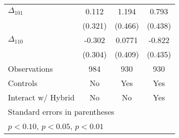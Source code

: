{\begin{tabular}{l*{3}{c}}
$\Delta_{101}$&    0.112         &    1.194\sym{**} &    0.793\sym{*}  \\
          &  (0.321)         &  (0.466)         &  (0.438)         \\
$\Delta_{110}$&   -0.302         &   0.0771         &   -0.822\sym{*}  \\
          &  (0.304)         &  (0.409)         &  (0.435)         \\
\hline
Observations&      984         &      930         &      930         \\
Controls  &       No         &      Yes         &      Yes         \\
Interact w/ Hybrid&       No         &       No         &      Yes         \\
\hline\hline
\multicolumn{4}{l}{\footnotesize Standard errors in parentheses}\\
\multicolumn{4}{l}{\footnotesize \sym{*} \(p<0.10\), \sym{**} \(p<0.05\), \sym{***} \(p<0.01\)}\\
\end{tabular}
}
